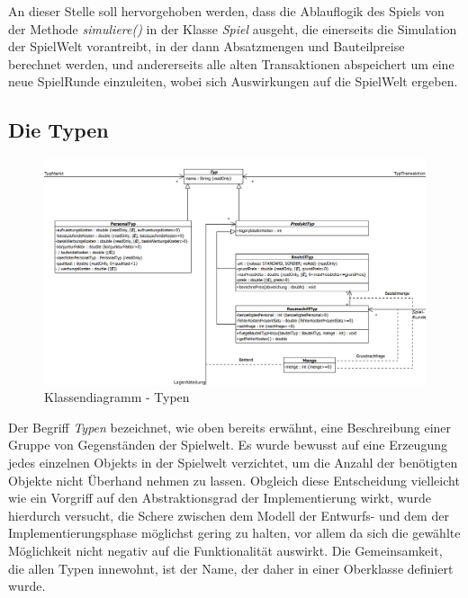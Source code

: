 An dieser Stelle soll hervorgehoben werden, dass die Ablauflogik des Spiels von der Methode \textit{simuliere()} in der Klasse \textit{Spiel} ausgeht, die einerseits die Simulation der SpielWelt vorantreibt, in der dann Absatzmengen und Bauteilpreise berechnet werden, und andererseits alle alten Transaktionen abspeichert um eine neue SpielRunde einzuleiten, wobei sich Auswirkungen auf die SpielWelt ergeben.

\subsection{Die Typen}
\begin{figure}[htb]
     \centering
     \includegraphics[width=\textwidth]{30_Fachkonzept/20_Entwurf/typ}
     \caption{Klassendiagramm - Typen}
     \label{img:fachkonzept-entwurf-typ}
\end{figure}

Der Begriff \textit{Typen} bezeichnet, wie oben bereits erwähnt, eine Beschreibung einer Gruppe von Gegenständen der Spielwelt. Es wurde bewusst auf eine Erzeugung jedes einzelnen Objekts in der Spielwelt verzichtet, um die Anzahl der benötigten Objekte nicht Überhand nehmen zu lassen. Obgleich diese Entscheidung vielleicht wie ein Vorgriff auf den Abstraktionsgrad der Implementierung wirkt, wurde hierdurch versucht, die Schere zwischen dem Modell der Entwurfs- und dem der Implementierungsphase möglichst gering zu halten, vor allem da sich die gewählte Möglichkeit nicht negativ auf die Funktionalität auswirkt. Die Gemeinsamkeit, die allen Typen innewohnt, ist der Name, der daher in einer Oberklasse definiert wurde.


